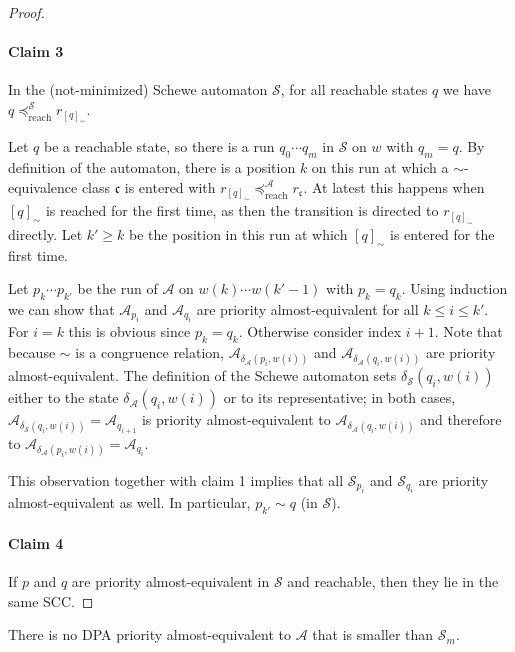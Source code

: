 \begin{proof}
	\paragraph{Claim 3} In the (not-minimized) Schewe automaton $\mathcal{S}$, for all reachable states $q$ we have $q \preceq_\text{reach}^\mathcal{S} r_{[q]_\sim}$.
	
	Let $q$ be a reachable state, so there is a run $q_0 \cdots q_m$ in $\mathcal{S}$ on $w$ with $q_m = q$. By definition of the automaton, there is a position $k$ on this run at which a $\sim$-equivalence class $\mathfrak{c}$ is entered with $r_{[q]_\sim} \preceq_\text{reach}^\mathcal{A} r_\mathfrak{c}$. At latest this happens when $[q]_\sim$ is reached for the first time, as then the transition is directed to $r_{[q]_\sim}$ directly. Let $k' \geq k$ be the position in this run at which $[q]_\sim$ is entered for the first time.
	
	Let $p_k \cdots p_{k'}$ be the run of $\mathcal{A}$ on $w(k) \cdots w(k'-1)$ with $p_k = q_k$. Using induction we can show that $\mathcal{A}_{p_i}$ and $\mathcal{A}_{q_i}$ are priority almost-equivalent for all $k \leq i \leq k'$. For $i = k$ this is obvious since $p_k = q_k$. Otherwise consider index $i+1$. Note that because $\sim$ is a congruence relation, $\mathcal{A}_{\delta_\mathcal{A}(p_i, w(i))}$ and $\mathcal{A}_{\delta_\mathcal{A}(q_i, w(i))}$ are priority almost-equivalent. The definition of the Schewe automaton sets $\delta_\mathcal{S}(q_i, w(i))$ either to the state $\delta_\mathcal{A}(q_i, w(i))$ or to its representative; in both cases, $\mathcal{A}_{\delta_\mathcal{S}(q_i, w(i))} = \mathcal{A}_{q_{i+1}}$ is priority almost-equivalent to $\mathcal{A}_{\delta_\mathcal{A}(q_i, w(i))}$ and therefore to $\mathcal{A}_{\delta_\mathcal{A}(p_i, w(i))} = \mathcal{A}_{q_i}$.
	
	This observation together with claim 1 implies that all $\mathcal{S}_{p_i}$ and $\mathcal{S}_{q_i}$ are priority almost-equivalent as well. In particular, $p_{k'} \sim q$ (in $\mathcal{S}$). 
	

	\paragraph{Claim 4} If $p$ and $q$ are priority almost-equivalent in $\mathcal{S}$ and reachable, then they lie in the same SCC.

\end{proof}

\begin{lem}
	There is no DPA priority almost-equivalent to $\mathcal{A}$ that is smaller than $\mathcal{S}_m$.
\end{lem}

